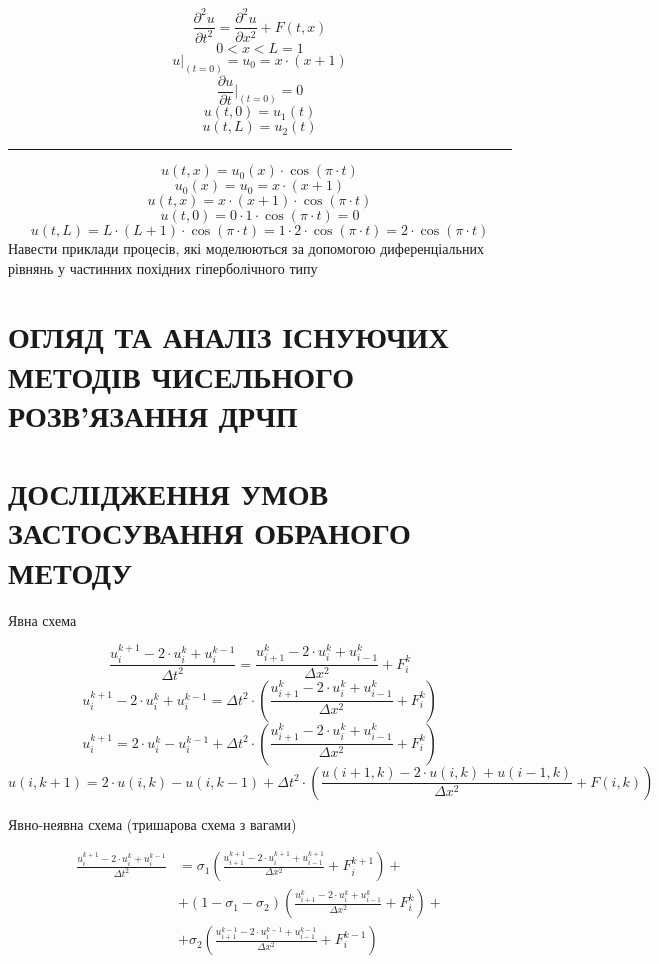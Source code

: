 \documentclass{article}
\begin{document}
    $$ \frac{\partial^2{u}}{\partial{t^2}} = \frac{\partial^2{u}}{\partial{x^2}} + F(t, x) $$
    $$ 0 < x < L = 1 $$
    $$ u \vert_{(t = 0)} = u_0 = x \cdot (x+1) $$
    $$ \frac{\partial{u}}{\partial{t}} \vert_{(t = 0)} = 0 $$
    $$ u(t, 0) = u_1(t) $$
    $$ u(t, L) = u_2(t) $$
    \hrule
    $$ u(t,x) = u_0(x) \cdot \cos(\pi \cdot t) $$
    $$ u_0(x) = u_0 = x \cdot (x+1) $$
    $$ u(t,x) = x \cdot (x+1) \cdot \cos(\pi \cdot t) $$
    $$ u(t,0) = 0 \cdot 1 \cdot \cos(\pi \cdot t) = 0 $$
    $$ u(t, L) = L \cdot (L+1) \cdot \cos(\pi \cdot t) = 1 \cdot 2 \cdot \cos(\pi \cdot t) = 2 \cdot \cos(\pi \cdot t) $$
    Навести приклади процесів, які моделюються за допомогою диференціальних рівнянь у частинних похідних гіперболічного типу
    
    \newpage
    \section{ОГЛЯД ТА АНАЛІЗ ІСНУЮЧИХ МЕТОДІВ ЧИСЕЛЬНОГО РОЗВ’ЯЗАННЯ ДРЧП}
    \newpage
    \section{ДОСЛІДЖЕННЯ УМОВ ЗАСТОСУВАННЯ ОБРАНОГО МЕТОДУ}

        Явна схема

        $$ \frac{u_i^{k+1} - 2 \cdot u_i^{k} + u_i^{k-1}}{\Delta{t}^2} = \frac{u_{i+1}^{k} - 2 \cdot u_i^{k} + u_{i-1}^{k}}{\Delta{x}^2} + F_i^{k} $$
        $$ u_i^{k+1} - 2 \cdot u_i^{k} + u_i^{k-1} = \Delta{t}^2 \cdot \left( \frac{u_{i+1}^{k} - 2 \cdot u_i^{k} + u_{i-1}^{k}}{\Delta{x}^2} + F_i^{k} \right) $$
        $$ u_i^{k+1} = 2 \cdot u_i^{k} - u_i^{k-1} + \Delta{t}^2 \cdot \left( \frac{u_{i+1}^{k} - 2 \cdot u_i^{k} + u_{i-1}^{k}}{\Delta{x}^2} + F_i^{k} \right) $$
        $$ u(i, k+1) = 2 \cdot u(i, k) - u(i, k-1) + \Delta{t}^2 \cdot \left( \frac{u(i+1, k) - 2 \cdot u(i, k) + u(i-1, k)}{\Delta{x}^2} + F(i, k) \right) $$

        Явно-неявна схема (тришарова схема з вагами)

        \begin{equation*}
            \begin{split}
                \frac{u_i^{k+1} - 2 \cdot u_i^{k} + u_i^{k-1}}{\Delta{t}^2} & = \sigma_1 \left( \frac{u_{i+1}^{k+1} - 2 \cdot u_i^{k+1} + u_{i-1}^{k+1}}{\Delta{x}^2} + F_i^{k+1} \right) +\\
                & + (1 - \sigma_1 - \sigma_2) \left( \frac{u_{i+1}^{k} - 2 \cdot u_i^{k} + u_{i-1}^{k}}{\Delta{x}^2} + F_i^{k} \right) +\\
                & + \sigma_2 \left( \frac{u_{i+1}^{k-1} - 2 \cdot u_i^{k-1} + u_{i-1}^{k-1}}{\Delta{x}^2} + F_i^{k-1} \right)\\
            \end{split}
        \end{equation*}
\end{document}

